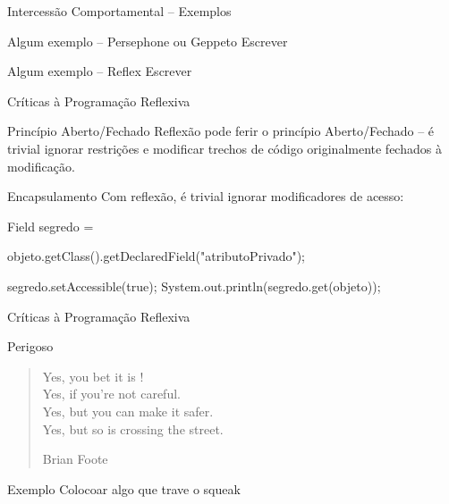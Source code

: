 \documentclass[12pt,t]{beamer}
\begin{document}
 	 \begin{frame}{Intercessão Comportamental -- Exemplos}
 	 	\begin{exampleblock}{Algum exemplo -- Persephone ou Geppeto}
 	 		\alert{Escrever}
 	 	\end{exampleblock}
 	 	\begin{exampleblock}{Algum exemplo -- Reflex}
 	 		\alert{Escrever}
 	 	\end{exampleblock}
 	 \end{frame} 	 
 	 \begin{frame}{Críticas à Programação Reflexiva}
 	 	\begin{block}{Princípio Aberto/Fechado}
 	 		Reflexão pode ferir o princípio Aberto/Fechado \cite{meyer1988object} -- é trivial ignorar restrições e modificar trechos de código originalmente fechados à modificação.
 	 	\end{block}
 	 	\begin{block}{Encapsulamento}
 	 		Com reflexão, é trivial ignorar modificadores de acesso:
 	 		\begin{adjustwidth}{2.5em}{0pt}
 	 			Field segredo = \\
 	 			\begin{adjustwidth}{2.5em}{0pt}
 	 				objeto.getClass().getDeclaredField("atributoPrivado");
 	 			\end{adjustwidth}
				segredo.setAccessible(true);
				System.out.println(segredo.get(objeto));
			\end{adjustwidth}
 	 	\end{block}
 	 \end{frame}
 	 \begin{frame}{Críticas à Programação Reflexiva}
 	 	\begin{block}{Perigoso}
 	 		\begin{quote}
				Yes, you bet it is ! \\
				Yes, if you're not careful. \\
				Yes, but you can make it safer. \\
				Yes, but so is crossing the street.
 	 			\begin{flushright}
 	 				Brian Foote
 	 			\end{flushright}
 	 		\end{quote}
 	 	\end{block}
 	 	\begin{exampleblock}{Exemplo}
 	 		\alert{Colocoar algo que trave o squeak}
 	 	\end{exampleblock}
 	 \end{frame}
\end{document}
